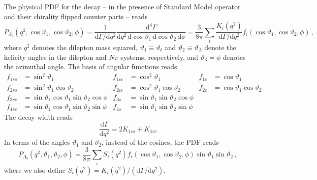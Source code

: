 \documentclass[aps,prd,reprint,nofootinbib,preprintnumbers]{revtex4}
\newcommand{\dd}{\text{d}}
\renewcommand{\theta}{\vartheta}
\begin{document}
The physical PDF for the decay -- in the presence of Standard Model operator and their chirality flipped counter parts -- reads \cite{Boeer:2014xx}
\begin{equation}
    P_{\Lambda_b}(q^2, \cos\theta_1, \cos\theta_2, \phi) = \frac{1}{\dd\Gamma/\dd q^2} \frac{\dd^4\Gamma}{\dd q^2\,\dd \cos\theta_1\,\dd \cos\theta_2\,\dd \phi} = \frac{3}{8\pi} \sum_i \frac{K_{i}(q^2)}{\dd \Gamma/\dd q^2} f_i(\cos\theta_1, \cos\theta_2, \phi)\,,
\end{equation}
where $q^2$ denotes the dilepton mass squared, $\theta_1 \equiv \theta_\ell$ and $\theta_2 \equiv \theta_\Lambda$ denote the
helicity angles in the dilepton and $N\pi$ systems, respectively, and $\theta_3 = \phi$ denotes the azimuthal angle.
The basis of angular functions reads \cite{Boeer:2014xx}
\begin{equation}
    \begin{aligned}
        f_{1ss} & = \sin^2\theta_1 &
        f_{1cc} & = \cos^2\theta_1 &
        f_{1c}  & = \cos\theta_1\\
        f_{2ss} & = \sin^2\theta_1 \cos\theta_2 &
        f_{2cc} & = \cos^2\theta_1 \cos\theta_2 &
        f_{2c}  & = \cos\theta_1   \cos\theta_2 \\
        f_{3sc} & = \sin\theta_1 \cos\theta_1 \sin\theta_2 \cos\phi &
        f_{3s}  & = \sin\theta_1              \sin\theta_2 \cos\phi \\
        f_{4sc} & = \sin\theta_1 \cos\theta_1 \sin\theta_2 \sin\phi &
        f_{4s}  & = \sin\theta_1              \sin\theta_2 \sin\phi
    \end{aligned}
\end{equation}
The decay width reads
\begin{equation}
    \frac{\dd \Gamma}{\dd q^2} = 2 K_{1ss} + K_{1cc}
\end{equation}
In terms of the angles $\theta_1$ and $\theta_2$, instead of the cosines, the PDF reads
\begin{equation}
    P_{\Lambda_b}(q^2, \theta_1, \theta_2, \phi) = \frac{3}{8\pi} \sum_i S_i(q^2) f_i(\cos\theta_1, \cos\theta_2, \phi) \sin\theta_1 \sin\theta_2\,,
\end{equation}
where we also define $S_i(q^2) = K_i(q^2) / (\dd\Gamma/\dd q^2)$.\\
\end{document}
